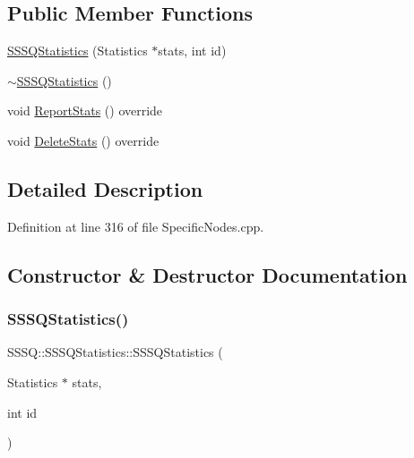 \subsection*{Public Member Functions}
\begin{DoxyCompactItemize}
\item 
\hyperlink{class_s_s_s_q_1_1_s_s_s_q_statistics_a798ff0289d3fcb85cd827ce0bc02babe}{S\+S\+S\+Q\+Statistics} (Statistics $\ast$stats, int id)
\item 
\hyperlink{class_s_s_s_q_1_1_s_s_s_q_statistics_a6e067067219125f919a9ee526324363b}{$\sim$\+S\+S\+S\+Q\+Statistics} ()
\item 
void \hyperlink{class_s_s_s_q_1_1_s_s_s_q_statistics_ab53eda9d3355dec31021cbdba9333c85}{Report\+Stats} () override
\item 
void \hyperlink{class_s_s_s_q_1_1_s_s_s_q_statistics_a8cddfec8ce3d2f4b31c15f3d07822b05}{Delete\+Stats} () override
\end{DoxyCompactItemize}


\subsection{Detailed Description}


Definition at line 316 of file Specific\+Nodes.\+cpp.



\subsection{Constructor \& Destructor Documentation}
\mbox{\label{class_s_s_s_q_1_1_s_s_s_q_statistics_a798ff0289d3fcb85cd827ce0bc02babe}} 
\subsubsection{\texorpdfstring{S\+S\+S\+Q\+Statistics()}{SSSQStatistics()}}
{\footnotesize\ttfamily S\+S\+S\+Q\+::\+S\+S\+S\+Q\+Statistics\+::\+S\+S\+S\+Q\+Statistics (\begin{DoxyParamCaption}\item[{Statistics $\ast$}]{stats,  }\item[{int}]{id }\end{DoxyParamCaption})\hspace{0.3cm}{\ttfamily [inline]}}



